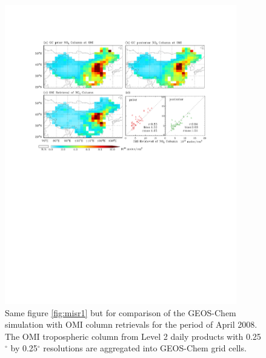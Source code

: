  \begin{figure}[h]
  \centering
  \includegraphics[width={0.9\textwidth}]{figures/a9.pdf}
  \caption{Same figure \ref{fig:misr1} but for comparison of the GEOS-Chem  simulation with OMI column  retrievals for the period of April 2008.  The OMI tropospheric column  from Level 2 daily products with 0.25$^{\circ}$ by 0.25$^{\circ}$ resolutions are aggregated into GEOS-Chem grid cells.}
  \label{fig:omno2}
 \end{figure}

